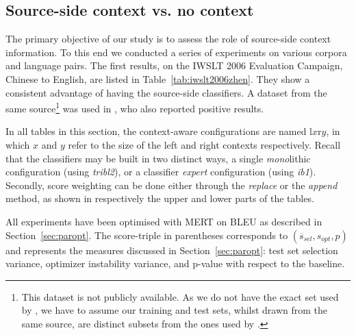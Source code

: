 \subsection{Source-side context vs. no context}
\label{sec:results1}

The primary objective of our study is to assess the role of source-side context
information. To this end we conducted a series of experiments on various
corpora and language pairs. The first results, on the IWSLT 2006 Evaluation
Campaign, Chinese to English, are listed in Table~\ref{tab:iwslt2006zhen}. They
show a consistent advantage of having the source-side classifiers. A dataset
from the same source\footnote{This dataset is not publicly available. As we do
not have the exact set used by \cite{Stroppa+07}, we have to assume our
training and test sets, whilst drawn from the same source, are distinct subsets
from the ones used by \cite{Stroppa+07}.} was used in \cite{Stroppa+07}, who
also reported positive results.

In all tables in this section, the context-aware configurations are named
l$x$r$y$, in which $x$ and $y$ refer to the size of the left and right contexts
respectively.  Recall that the classifiers may be built in two distinct ways, a
single \emph{mono}lithic configuration (using \emph{tribl2}), or a classifier
\emph{expert} configuration (using \emph{ib1}).  Secondly, score weighting can
be done either through the \emph{replace}  or the \emph{append} method, as
shown in respectively the upper and lower parts of the tables. 

All experiments have been optimised with MERT on BLEU as described in
Section~\ref{sec:paropt}.  The score-triple in parentheses corresponds to
$(\overline{s}_{sel},s_{opt},p)$ and represents the measures discussed in
Section~\ref{sec:paropt}: test set selection variance, optimizer instability
variance, and p-value with respect to the baseline.

